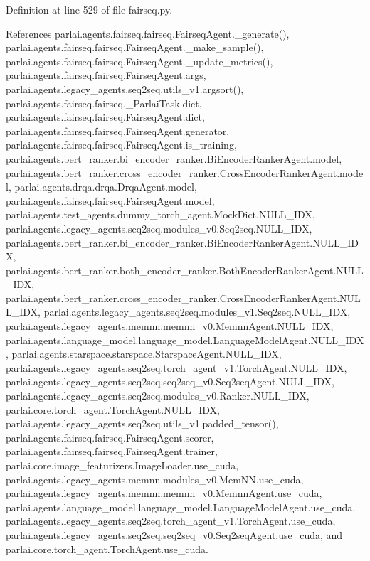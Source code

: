 Definition at line 529 of file fairseq.\+py.



References parlai.\+agents.\+fairseq.\+fairseq.\+Fairseq\+Agent.\+\_\+generate(), parlai.\+agents.\+fairseq.\+fairseq.\+Fairseq\+Agent.\+\_\+make\+\_\+sample(), parlai.\+agents.\+fairseq.\+fairseq.\+Fairseq\+Agent.\+\_\+update\+\_\+metrics(), parlai.\+agents.\+fairseq.\+fairseq.\+Fairseq\+Agent.\+args, parlai.\+agents.\+legacy\+\_\+agents.\+seq2seq.\+utils\+\_\+v1.\+argsort(), parlai.\+agents.\+fairseq.\+fairseq.\+\_\+\+Parlai\+Task.\+dict, parlai.\+agents.\+fairseq.\+fairseq.\+Fairseq\+Agent.\+dict, parlai.\+agents.\+fairseq.\+fairseq.\+Fairseq\+Agent.\+generator, parlai.\+agents.\+fairseq.\+fairseq.\+Fairseq\+Agent.\+is\+\_\+training, parlai.\+agents.\+bert\+\_\+ranker.\+bi\+\_\+encoder\+\_\+ranker.\+Bi\+Encoder\+Ranker\+Agent.\+model, parlai.\+agents.\+bert\+\_\+ranker.\+cross\+\_\+encoder\+\_\+ranker.\+Cross\+Encoder\+Ranker\+Agent.\+model, parlai.\+agents.\+drqa.\+drqa.\+Drqa\+Agent.\+model, parlai.\+agents.\+fairseq.\+fairseq.\+Fairseq\+Agent.\+model, parlai.\+agents.\+test\+\_\+agents.\+dummy\+\_\+torch\+\_\+agent.\+Mock\+Dict.\+N\+U\+L\+L\+\_\+\+I\+DX, parlai.\+agents.\+legacy\+\_\+agents.\+seq2seq.\+modules\+\_\+v0.\+Seq2seq.\+N\+U\+L\+L\+\_\+\+I\+DX, parlai.\+agents.\+bert\+\_\+ranker.\+bi\+\_\+encoder\+\_\+ranker.\+Bi\+Encoder\+Ranker\+Agent.\+N\+U\+L\+L\+\_\+\+I\+DX, parlai.\+agents.\+bert\+\_\+ranker.\+both\+\_\+encoder\+\_\+ranker.\+Both\+Encoder\+Ranker\+Agent.\+N\+U\+L\+L\+\_\+\+I\+DX, parlai.\+agents.\+bert\+\_\+ranker.\+cross\+\_\+encoder\+\_\+ranker.\+Cross\+Encoder\+Ranker\+Agent.\+N\+U\+L\+L\+\_\+\+I\+DX, parlai.\+agents.\+legacy\+\_\+agents.\+seq2seq.\+modules\+\_\+v1.\+Seq2seq.\+N\+U\+L\+L\+\_\+\+I\+DX, parlai.\+agents.\+legacy\+\_\+agents.\+memnn.\+memnn\+\_\+v0.\+Memnn\+Agent.\+N\+U\+L\+L\+\_\+\+I\+DX, parlai.\+agents.\+language\+\_\+model.\+language\+\_\+model.\+Language\+Model\+Agent.\+N\+U\+L\+L\+\_\+\+I\+DX, parlai.\+agents.\+starspace.\+starspace.\+Starspace\+Agent.\+N\+U\+L\+L\+\_\+\+I\+DX, parlai.\+agents.\+legacy\+\_\+agents.\+seq2seq.\+torch\+\_\+agent\+\_\+v1.\+Torch\+Agent.\+N\+U\+L\+L\+\_\+\+I\+DX, parlai.\+agents.\+legacy\+\_\+agents.\+seq2seq.\+seq2seq\+\_\+v0.\+Seq2seq\+Agent.\+N\+U\+L\+L\+\_\+\+I\+DX, parlai.\+agents.\+legacy\+\_\+agents.\+seq2seq.\+modules\+\_\+v0.\+Ranker.\+N\+U\+L\+L\+\_\+\+I\+DX, parlai.\+core.\+torch\+\_\+agent.\+Torch\+Agent.\+N\+U\+L\+L\+\_\+\+I\+DX, parlai.\+agents.\+legacy\+\_\+agents.\+seq2seq.\+utils\+\_\+v1.\+padded\+\_\+tensor(), parlai.\+agents.\+fairseq.\+fairseq.\+Fairseq\+Agent.\+scorer, parlai.\+agents.\+fairseq.\+fairseq.\+Fairseq\+Agent.\+trainer, parlai.\+core.\+image\+\_\+featurizers.\+Image\+Loader.\+use\+\_\+cuda, parlai.\+agents.\+legacy\+\_\+agents.\+memnn.\+modules\+\_\+v0.\+Mem\+N\+N.\+use\+\_\+cuda, parlai.\+agents.\+legacy\+\_\+agents.\+memnn.\+memnn\+\_\+v0.\+Memnn\+Agent.\+use\+\_\+cuda, parlai.\+agents.\+language\+\_\+model.\+language\+\_\+model.\+Language\+Model\+Agent.\+use\+\_\+cuda, parlai.\+agents.\+legacy\+\_\+agents.\+seq2seq.\+torch\+\_\+agent\+\_\+v1.\+Torch\+Agent.\+use\+\_\+cuda, parlai.\+agents.\+legacy\+\_\+agents.\+seq2seq.\+seq2seq\+\_\+v0.\+Seq2seq\+Agent.\+use\+\_\+cuda, and parlai.\+core.\+torch\+\_\+agent.\+Torch\+Agent.\+use\+\_\+cuda.
